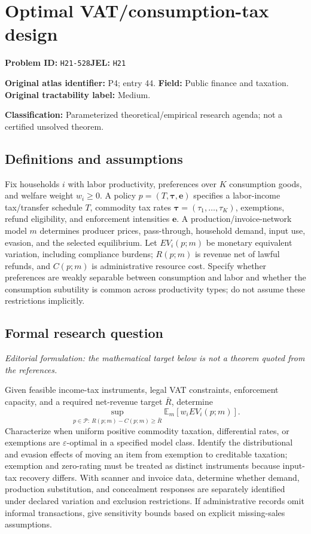 \documentclass[11pt,a4paper]{article}
\begin{document}
\section*{Optimal VAT/consumption-tax design}
\textbf{Problem ID:} \texttt{H21-528}\quad \textbf{JEL:} \texttt{H21}\par
\label{problem:OP-0044}
\label{atlas:prob:P4}
\noindent\textbf{Original atlas identifier:} P4; entry 44. \textbf{Field:} Public finance and taxation. \textbf{Original tractability label:} Medium.

\noindent\textbf{Classification:} Parameterized theoretical/empirical research agenda; not a certified unsolved theorem.

\subsection*{Definitions and assumptions}
Fix households $i$ with labor productivity, preferences over $K$ consumption goods, and welfare weight $w_i\geq0$. A policy $p=(T,\boldsymbol\tau,\boldsymbol e)$ specifies a labor-income tax/transfer schedule $T$, commodity tax rates $\boldsymbol\tau=(\tau_1,\ldots,\tau_K)$, exemptions, refund eligibility, and enforcement intensities $\boldsymbol e$. A production/invoice-network model $m$ determines producer prices, pass-through, household demand, input use, evasion, and the selected equilibrium. Let $EV_i(p;m)$ be monetary equivalent variation, including compliance burdens; $R(p;m)$ is revenue net of lawful refunds, and $C(p;m)$ is administrative resource cost. Specify whether preferences are weakly separable between consumption and labor and whether the consumption subutility is common across productivity types; do not assume these restrictions implicitly.

\subsection*{Formal research question}
\emph{Editorial formulation: the mathematical target below is not a theorem quoted from the references.}

Given feasible income-tax instruments, legal VAT constraints, enforcement capacity, and a required net-revenue target $\bar R$, determine
\[
 \sup_{p\in\mathcal P:\ R(p;m)-C(p;m)\geq\bar R}\mathbb E_m[w_iEV_i(p;m)].
\]
Characterize when uniform positive commodity taxation, differential rates, or exemptions are $\varepsilon$-optimal in a specified model class. Identify the distributional and evasion effects of moving an item from exemption to creditable taxation; exemption and zero-rating must be treated as distinct instruments because input-tax recovery differs. With scanner and invoice data, determine whether demand, production substitution, and concealment responses are separately identified under declared variation and exclusion restrictions. If administrative records omit informal transactions, give sensitivity bounds based on explicit missing-sales assumptions.
\end{document}
